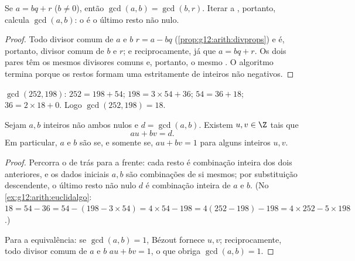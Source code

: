 \begin{proposition}\label{prop:g12:arith:euclidalgo}
Se $a = bq + r$ ($b \neq 0$), então $\gcd(a, b) = \gcd(b, r)$. Iterar a
, portanto, calcula $\gcd(a,b)$: o  é o último resto
não nulo.
\end{proposition}

\begin{proof}
Todo divisor comum de $a$ e $b$  $r = a - bq$
(\cref{prop:g12:arith:divprops}) e é, portanto, divisor comum de $b$ e
$r$; e reciprocamente, já que $a = bq + r$. Os dois pares têm os mesmos
divisores comuns e, portanto, o mesmo . O algoritmo termina porque os
restos formam uma  estritamente  de inteiros não
negativos.
\end{proof}

\begin{example}\label{ex:g12:arith:euclidalgo}
$\gcd(252, 198)$: $252 = 198 + 54$; $198 = 3\times54 + 36$;
$54 = 36 + 18$; $36 = 2 \times 18 + 0$. Logo
$\gcd(252,198) = 18$.
\end{example}

\begin{theorem}\label{thm:g12:arith:bezout}
Sejam $a, b$ inteiros não ambos nulos e $d = \gcd(a,b)$. Existem
$u, v \in \Z$ tais que
\[
au + bv = d .
\]
Em particular, $a$ e $b$ são  se, e somente se,
$au + bv = 1$ para alguns inteiros $u, v$.
\end{theorem}

\begin{proof}
Percorra o  de trás para a frente: cada resto é
combinação inteira dos dois anteriores, e os dados iniciais $a, b$ são
combinações de si mesmos; por substituição descendente, o último resto não
nulo $d$ é combinação inteira de $a$ e $b$. (No
\cref{ex:g12:arith:euclidalgo}:
$18 = 54 - 36 = 54 - (198 - 3\times54) = 4\times54 - 198 =
4(252 - 198) - 198 = 4\times252 - 5\times198$.)

Para a equivalência: se $\gcd(a,b) = 1$, Bézout fornece $u, v$;
reciprocamente, todo divisor comum de $a$ e $b$  $au + bv = 1$, o
que obriga $\gcd(a,b) = 1$.
\end{proof}

